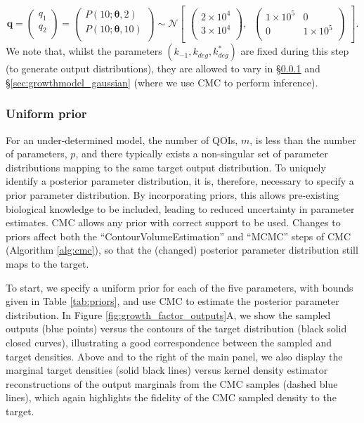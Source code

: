 \begin{equation}\label{eq:MM_outputDistribution}
\boldsymbol{q} =
\begin{pmatrix}
q_1\\
q_2\\
\end{pmatrix}
=
\begin{pmatrix}
P(10; \boldsymbol{\theta}, 2)\\
P(10; \boldsymbol{\theta}, 10)\\
\end{pmatrix} \sim  \mathcal{N}
\begin{bmatrix}
\begin{pmatrix}
2\times 10^4\\
3\times 10^4\\
\end{pmatrix}, \;\;
\begin{pmatrix}
1\times 10^5 & 0\\
0 & 1\times 10^5\\
\end{pmatrix}
\end{bmatrix}.
\end{equation}
%
We note that, whilst the parameters $(k_{-1}, k_{deg}, k^*_{deg})$ are fixed during this step (to generate output distributions), they are allowed to vary in \S\ref{sec:growthmodel_uniform} and \S\ref{sec:growthmodel_gaussian} (where we use CMC to perform inference).

\subsubsection{Uniform prior}\label{sec:growthmodel_uniform}
For an under-determined model, the number of QOIs, $m$, is less than the number of parameters, $p$, and there typically exists a non-singular set of parameter distributions mapping to the same target output distribution. To uniquely identify a posterior parameter distribution, it is, therefore, necessary to specify a prior parameter distribution. By incorporating priors, this allows pre-existing biological knowledge to be included, leading to reduced uncertainty in parameter estimates. CMC allows any prior with correct support to be used. Changes to priors affect both the ``ContourVolumeEstimation'' and ``MCMC'' steps of CMC (Algorithm \ref{alg:cmc}), so that the (changed) posterior parameter distribution still maps to the target.

To start, we specify a uniform prior for each of the five parameters, with bounds given in Table \ref{tab:priors}, and use CMC to estimate the posterior parameter distribution. In Figure \ref{fig:growth_factor_outputs}A, we show the sampled outputs (blue points) versus the contours of the target distribution (black solid closed curves), illustrating a good correspondence between the sampled and target densities. Above and to the right of the main panel, we also display the marginal target densities (solid black lines) versus kernel density estimator reconstructions of the output marginals from the CMC samples (dashed blue lines), which again highlights the fidelity of the CMC sampled density to the target.

